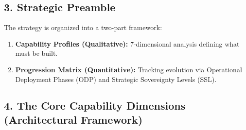\documentclass[12pt,a4paper]{report}
\begin{document}
\subsection{3. Strategic Preamble}
The strategy is organized into a two-part framework:
\begin{enumerate}
    \item \textbf{Capability Profiles (Qualitative):} 7-dimensional analysis defining what must be built.
    \item \textbf{Progression Matrix (Quantitative):} Tracking evolution via Operational Deployment Phases (ODP) and Strategic Sovereignty Levels (SSL).
\end{enumerate}

\subsection{4. The Core Capability Dimensions (Architectural Framework)}
\end{document}

